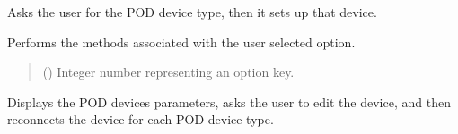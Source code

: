 \documentclass[letterpaper,10pt,english]{sphinxmanual}
\begin{document}
\begin{fulllineitems}

\begin{fulllineitems}
\label{\detokenize{Setup_PodDevices:Setup_PodDevices.Setup_PodDevices._ConnectNewDevice}}
\pysigstartsignatures
{}
\pysigstopsignatures
\sphinxAtStartPar
Asks the user for the POD device type, then it sets up that device.

\end{fulllineitems}


\begin{fulllineitems}
\label{\detokenize{Setup_PodDevices:Setup_PodDevices.Setup_PodDevices._DoOption}}
\pysigstartsignatures
{}
\pysigstopsignatures
\sphinxAtStartPar
Performs the methods associated with the user selected option.
\begin{quote}\begin{description}
\sphinxAtStartPar
{} () \textendash{} Integer number representing an option key.

\end{description}\end{quote}

\end{fulllineitems}


\begin{fulllineitems}
\label{\detokenize{Setup_PodDevices:Setup_PodDevices.Setup_PodDevices._EditCheckConnect}}
\pysigstartsignatures
{}
\pysigstopsignatures
\sphinxAtStartPar
Displays the POD devices parameters, asks the user to edit the device, and then reconnects         the device for each POD device type.


\end{fulllineitems}
\end{fulllineitems}
\end{document}
